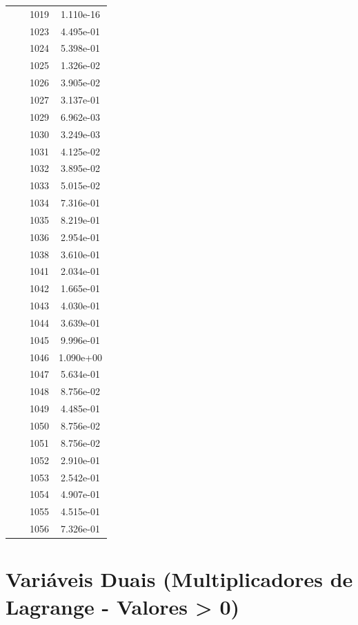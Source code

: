 \documentclass[12pt]{article}
\begin{document}
\begin{longtable}{@{}cccc@{}}
 &  & 1019 & 1.110e-16 \\
 &  & 1023 & 4.495e-01 \\
 &  & 1024 & 5.398e-01 \\
 &  & 1025 & 1.326e-02 \\
 &  & 1026 & 3.905e-02 \\
 &  & 1027 & 3.137e-01 \\
 &  & 1029 & 6.962e-03 \\
 &  & 1030 & 3.249e-03 \\
 &  & 1031 & 4.125e-02 \\
 &  & 1032 & 3.895e-02 \\
 &  & 1033 & 5.015e-02 \\
 &  & 1034 & 7.316e-01 \\
 &  & 1035 & 8.219e-01 \\
 &  & 1036 & 2.954e-01 \\
 &  & 1038 & 3.610e-01 \\
 &  & 1041 & 2.034e-01 \\
 &  & 1042 & 1.665e-01 \\
 &  & 1043 & 4.030e-01 \\
 &  & 1044 & 3.639e-01 \\
 &  & 1045 & 9.996e-01 \\
 &  & 1046 & 1.090e+00 \\
 &  & 1047 & 5.634e-01 \\
 &  & 1048 & 8.756e-02 \\
 &  & 1049 & 4.485e-01 \\
 &  & 1050 & 8.756e-02 \\
 &  & 1051 & 8.756e-02 \\
 &  & 1052 & 2.910e-01 \\
 &  & 1053 & 2.542e-01 \\
 &  & 1054 & 4.907e-01 \\
 &  & 1055 & 4.515e-01 \\
 &  & 1056 & 7.326e-01 \\

\bottomrule
\end{longtable}


\section{Variáveis Duais (Multiplicadores de Lagrange - Valores > 0)}
\end{document}
